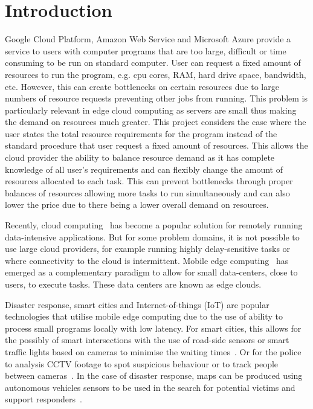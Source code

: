 \chapter{Introduction}\label{ch:introduction}
Google Cloud Platform, Amazon Web Service and Microsoft Azure provide a service to users with computer programs that
are too large, difficult or time consuming to be run on standard computer. User can request a fixed amount of resources
to run the program, e.g. cpu cores, RAM, hard drive space, bandwidth, etc. However,
this can create bottlenecks on certain resources due to large numbers of resource requests preventing other jobs from
running. This problem is particularly relevant in edge cloud computing as servers
are small thus making the demand on resources much greater. This project considers the case where the user states
the total resource requirements for the program instead of the standard procedure that user request a fixed
amount of resources. This allows the cloud provider the ability to balance resource demand as it has
complete knowledge of all user's requirements and can flexibly change the amount of resources allocated to each
task. This can prevent bottlenecks through proper balances of resources allowing more tasks to run simultaneously
and can also lower the price due to there being a lower overall demand on resources.

Recently, cloud computing~\citep{cloud_cite} has become a popular solution for remotely running data-intensive applications.
But for some problem domains, it is not possible to use large cloud providers, for example running highly delay-sensitive
tasks or where connectivity to the cloud is intermittent. Mobile edge computing~\citep{mobile_edge_survey} has emerged as a
complementary paradigm to allow for small data-centers, close to users, to execute tasks. These data centers are known
as edge clouds.

Disaster response, smart cities and Internet-of-things (IoT) are popular technologies that utilise mobile edge
computing due to the use of ability to process small programs locally with low latency. For smart cities, this
allows for the possibly of smart intersections with the use of road-side sensors or smart traffic lights based
on cameras to minimise the waiting times~\citep{smart_cities_traffic_lights}. Or for the police to analysis
CCTV footage to spot suspicious behaviour or to track people between cameras~\citep{Sreenu2019}. In the case
of disaster response, maps can be produced using autonomous vehicles sensors to be used in the search for potential
victims and support responders~\citep{smart_disaster_management}.

